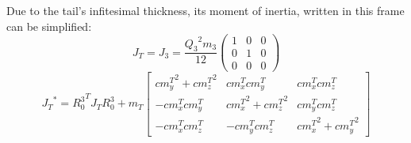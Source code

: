 Due to the tail's infitesimal thickness, its moment of inertia, written in this frame can be simplified:
\begin{equation}
J_T=J_3=\frac{{Q_3}^2 m_3}{12}\left(
\begin{array}{ccc}
 1 & 0 & 0 \\
 0 & 1 & 0 \\
 0 & 0 & 0
\end{array}
\right)
\end{equation} 
\small
\begin{equation}
{J_T}^*={R_0^3}^TJ_TR_0^3+m_T\begin{bmatrix}
{cm_y^T}^2 +{cm_z^T}^2& {cm_x^T}{cm_y^T}& {cm_x^T}{cm_z^T} \\ 
-{cm_x^T}{cm_y^T} & {cm_x^T}^2+{cm_z^T}^2 & {cm_y^T}{cm_z^T}\\ 
-{cm_x^T}{cm_z^T} & -{cm_y^T}{cm_z^T} & {cm_x^T}^2+{cm_y^T}^2
\end{bmatrix}
\end{equation}
\normalsize
